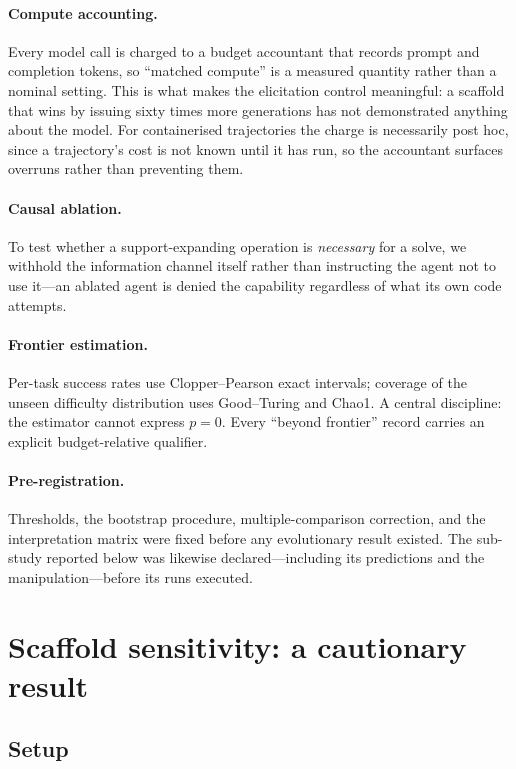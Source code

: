 \documentclass{article}
\begin{document}
\paragraph{Compute accounting.}
Every model call is charged to a budget accountant that records prompt and
completion tokens, so ``matched compute'' is a measured quantity rather than
a nominal setting. This is what makes the elicitation control meaningful: a
scaffold that wins by issuing sixty times more generations has not
demonstrated anything about the model. For containerised trajectories the
charge is necessarily post hoc, since a trajectory's cost is not known until
it has run, so the accountant surfaces overruns rather than preventing them.

\paragraph{Causal ablation.}
To test whether a support-expanding operation is \emph{necessary} for a solve,
we withhold the information channel itself rather than instructing the agent
not to use it---an ablated agent is denied the capability regardless of what
its own code attempts.

\paragraph{Frontier estimation.}
Per-task success rates use Clopper--Pearson exact intervals; coverage of the
unseen difficulty distribution uses Good--Turing and Chao1. A central
discipline: the estimator cannot express $p = 0$. Every ``beyond frontier''
record carries an explicit budget-relative qualifier.

\paragraph{Pre-registration.}
Thresholds, the bootstrap procedure, multiple-comparison correction, and the
interpretation matrix were fixed before any evolutionary result existed. The
sub-study reported below was likewise declared---including its predictions and
the manipulation---before its runs executed.

\section{Scaffold sensitivity: a cautionary result}
\label{sec:results}

\subsection{Setup}
\end{document}
